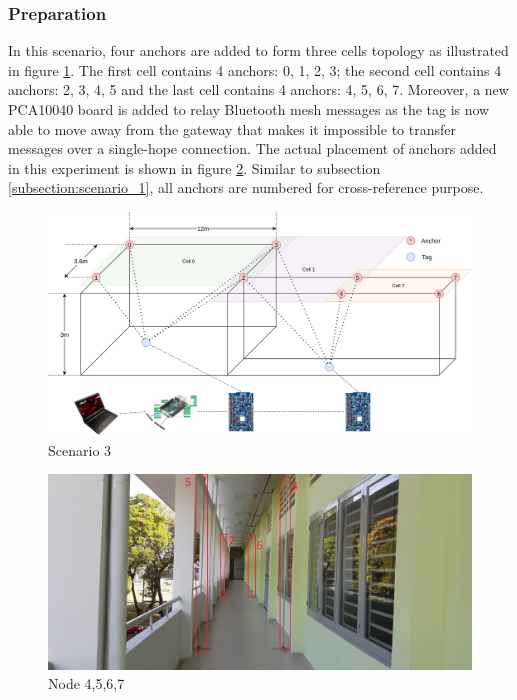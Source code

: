 \documentclass[\main/thesis.tex]{subfiles}
\begin{document}
\subsubsection{Preparation}
In this scenario, four anchors are added to form three cells topology as illustrated in figure \ref{fig:scenario_3}. The first cell contains 4 anchors: 0, 1, 2, 3; the second cell contains 4 anchors: 2, 3, 4, 5 and the last cell contains 4 anchors: 4, 5, 6, 7. Moreover, a new PCA10040 board is added to relay Bluetooth mesh messages as the tag is now able to move away from the gateway that makes it impossible to transfer messages over a single-hope connection. The actual placement of anchors added in this experiment is shown in figure \ref{fig:node_4_5_6_7}.
Similar to subsection \ref{subsection:scenario_1}, all anchors are numbered for cross-reference purpose.
\begin{figure}[H]   
    \centering
    \includegraphics[width=1\textwidth]{system_overview_phy_full.png}
    \caption{Scenario 3}
    \label{fig:scenario_3}
\end{figure}
\begin{figure}[H]      
    \centering
    \includegraphics[width=1\textwidth]{arena_03.jpg}
    \caption{Node 4,5,6,7}
    \label{fig:node_4_5_6_7}
\end{figure}
\end{document}
